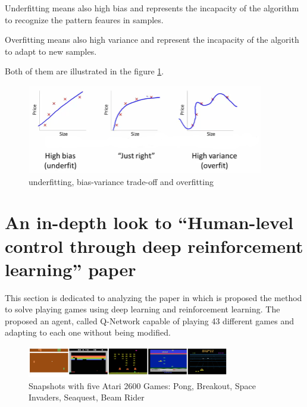 Underfitting means also high bias and represents the incapacity of the algorithm to recognize the pattern feaures in samples.

Overfitting means also high variance and represent the incapacity of the algorith to adapt to new samples.

Both of them are illustrated in the figure \ref{fig:overfitting}.

\begin{figure}[h]
	\begin{center}
		\includegraphics[width=390px,height=147px]{src/img/state/overfitting}
		\caption{underfitting, bias-variance trade-off and overfitting\cite{ng}} \label{fig:overfitting}
    \end{center}
\end{figure}

\newpage

\section{An in-depth look to ``Human-level control through deep reinforcement learning'' paper}
This section is dedicated to analyzing the paper in which is proposed the method to solve playing games using deep learning and reinforcement learning. The proposed an agent, called Q-Network capable of playing 43 different games and adapting to each one without being modified.


\begin{figure}[h]
	\begin{center}
		\includegraphics[width=334px,height=51px]{src/img/state/ataripic}
		\caption{Snapshots with five Atari 2600 Games: Pong, Breakout, Space Invaders, Seaquest, Beam Rider\cite{nature}} \label{fig:ataripic}
    \end{center}
\end{figure}




